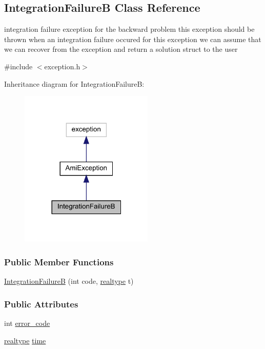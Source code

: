\hypertarget{classamici_1_1_integration_failure_b}{}\subsection{Integration\+FailureB Class Reference}
\label{classamici_1_1_integration_failure_b}


integration failure exception for the backward problem this exception should be thrown when an integration failure occured for this exception we can assume that we can recover from the exception and return a solution struct to the user  




{\ttfamily \#include $<$exception.\+h$>$}



Inheritance diagram for Integration\+FailureB\+:
\nopagebreak
\begin{figure}[H]
\begin{center}
\leavevmode
\includegraphics[width=180pt]{classamici_1_1_integration_failure_b__inherit__graph}
\end{center}
\end{figure}
\subsubsection*{Public Member Functions}
\begin{DoxyCompactItemize}
\item 
\mbox{\hyperlink{classamici_1_1_integration_failure_b_ad87179c92d6479d56fb3977efa1dc481}{Integration\+FailureB}} (int code, \mbox{\hyperlink{namespaceamici_a1bdce28051d6a53868f7ccbf5f2c14a3}{realtype}} t)
\end{DoxyCompactItemize}
\subsubsection*{Public Attributes}
\begin{DoxyCompactItemize}
\item 
int \mbox{\hyperlink{classamici_1_1_integration_failure_b_a7d16b1c68c87cec009d972e79abfba78}{error\+\_\+code}}
\item 
\mbox{\hyperlink{namespaceamici_a1bdce28051d6a53868f7ccbf5f2c14a3}{realtype}} \mbox{\hyperlink{classamici_1_1_integration_failure_b_a6dcdb92539544d894bdc153b3ba8bea6}{time}}
\end{DoxyCompactItemize}


